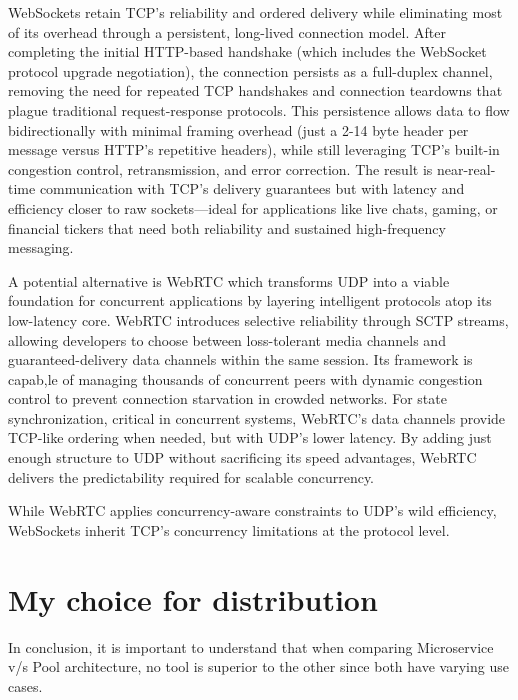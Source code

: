 \documentclass[]{final}
\begin{document}
WebSockets retain TCP's reliability and ordered delivery while eliminating most
of its overhead through a persistent, long-lived connection model. After
completing the initial HTTP-based handshake (which includes the WebSocket
protocol upgrade negotiation), the connection persists as a full-duplex
channel, removing the need for repeated TCP handshakes and connection
teardowns that plague traditional request-response protocols. This persistence
allows data to flow bidirectionally with minimal framing overhead (just a 2-14
byte header per message versus HTTP's repetitive headers), while still
leveraging TCP's built-in congestion control, retransmission, and error
correction. The result is near-real-time communication with TCP's delivery
guarantees but with latency and efficiency closer to raw sockets—ideal for
applications like live chats, gaming, or financial tickers that need both
reliability and sustained high-frequency messaging.


A potential alternative is
WebRTC which transforms UDP into a viable foundation for concurrent
applications by
layering intelligent protocols atop its low-latency core.
WebRTC introduces selective reliability through SCTP streams, allowing
developers to choose between loss-tolerant media channels and
guaranteed-delivery data channels within the same session. Its framework
is capab,le of managing thousands of concurrent peers with dynamic
congestion control to prevent connection starvation in
crowded networks. For state synchronization, critical in concurrent systems,
WebRTC's data channels provide TCP-like ordering when needed, but with UDP's
lower latency. By
adding just enough structure to UDP without sacrificing its speed advantages,
WebRTC delivers the predictability required for scalable concurrency.

While WebRTC applies concurrency-aware constraints to UDP's wild efficiency,
WebSockets inherit TCP's concurrency limitations at the protocol level.

\section{My choice for distribution}


In conclusion, it is important to understand that when comparing Microservice v/s Pool architecture, no tool is superior to the other since both have varying use cases.
\end{document}
